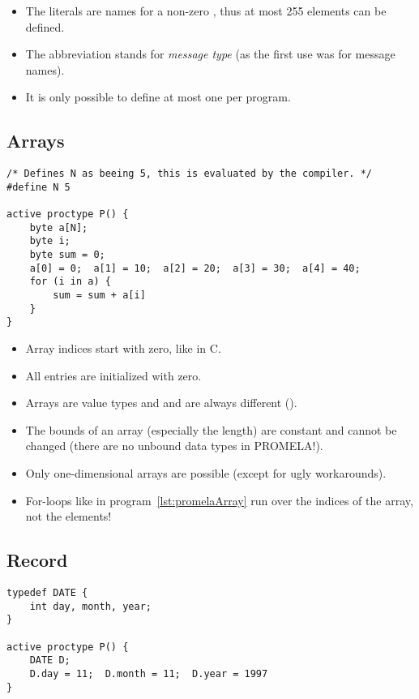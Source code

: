 		\begin{itemize}
			\item The literals are names for a non-zero , thus at most 255 elements can be defined.
			\item The abbreviation  stands for \textit{message type} (as the first use was for message names).
			\item It is only possible to define at most one  per program.
		\end{itemize}

	\subsection{Arrays}
		\begin{lstlisting}[caption = { PROMELA Arrays }, label = lst:promelaArray, language = PROMELA]
/* Defines N as beeing 5, this is evaluated by the compiler. */
#define N 5

active proctype P() {
	byte a[N];
	byte i;
	byte sum = 0;
	a[0] = 0;  a[1] = 10;  a[2] = 20;  a[3] = 30;  a[4] = 40;
	for (i in a) {
		sum = sum + a[i]
	}
}
			\end{lstlisting}

		\begin{itemize}
			\item Array indices start with zero, like in C.
			\item All entries are initialized with zero.
			\item Arrays are value types and  and  are always different ().
			\item The bounds of an array (especially the length) are constant and cannot be changed (there are no unbound data types in PROMELA!).
			\item Only one-dimensional arrays are possible (except for ugly workarounds).
			\item For-loops like in program~\ref{lst:promelaArray} run over the indices of the array, not the elements!
		\end{itemize}

	\subsection{Record}
		\begin{lstlisting}[caption = { PROMELA Records }, label = lst:promelaRecord, language = PROMELA]
typedef DATE {
	int day, month, year;
}

active proctype P() {
	DATE D;
	D.day = 11;  D.month = 11;  D.year = 1997
}
			\end{lstlisting}

